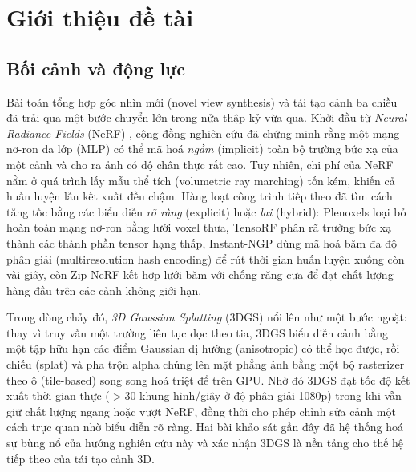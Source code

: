 
\section{Giới thiệu đề tài}

    \subsection{Bối cảnh và động lực}
    Bài toán tổng hợp góc nhìn mới (novel view synthesis) và tái tạo cảnh ba chiều
    đã trải qua một bước chuyển lớn trong nửa thập kỷ vừa qua. Khởi đầu từ
    \textit{Neural Radiance Fields} (NeRF) \cite{nerf}, cộng đồng nghiên cứu đã chứng
    minh rằng một mạng nơ-ron đa lớp (MLP) có thể mã hoá \textit{ngầm} (implicit)
    toàn bộ trường bức xạ của một cảnh và cho ra ảnh có độ chân thực rất cao. Tuy
    nhiên, chi phí của NeRF nằm ở quá trình lấy mẫu thể tích (volumetric ray
    marching) tốn kém, khiến cả huấn luyện lẫn kết xuất đều chậm. Hàng loạt công
    trình tiếp theo đã tìm cách tăng tốc bằng các biểu diễn \textit{rõ ràng}
    (explicit) hoặc \textit{lai} (hybrid): Plenoxels \cite{plenoxels} loại bỏ hoàn
    toàn mạng nơ-ron bằng lưới voxel thưa, TensoRF \cite{tensorf} phân rã trường bức
    xạ thành các thành phần tensor hạng thấp, Instant-NGP \cite{instantngp} dùng mã
    hoá băm đa độ phân giải (multiresolution hash encoding) để rút thời gian huấn
    luyện xuống còn vài giây, còn Zip-NeRF \cite{zipnerf} kết hợp lưới băm với chống
    răng cưa để đạt chất lượng hàng đầu trên các cảnh không giới hạn.

    Trong dòng chảy đó, \textit{3D Gaussian Splatting} (3DGS) \cite{kerbl3dgs} nổi
    lên như một bước ngoặt: thay vì truy vấn một trường liên tục dọc theo tia,
    3DGS biểu diễn cảnh bằng một tập hữu hạn các điểm Gaussian dị hướng
    (anisotropic) có thể học được, rồi chiếu (splat) và pha trộn alpha chúng lên mặt
    phẳng ảnh bằng một bộ rasterizer theo ô (tile-based) song song hoá triệt để trên
    GPU. Nhờ đó 3DGS đạt tốc độ kết xuất thời gian thực ($>30$ khung hình/giây ở độ
    phân giải 1080p) trong khi vẫn giữ chất lượng ngang hoặc vượt NeRF, đồng thời cho
    phép chỉnh sửa cảnh một cách trực quan nhờ biểu diễn rõ ràng. Hai bài khảo sát
    gần đây \cite{survey_chen,survey_fei} đã hệ thống hoá sự bùng nổ của hướng nghiên
    cứu này và xác nhận 3DGS là nền tảng cho thế hệ tiếp theo của tái tạo cảnh 3D.

